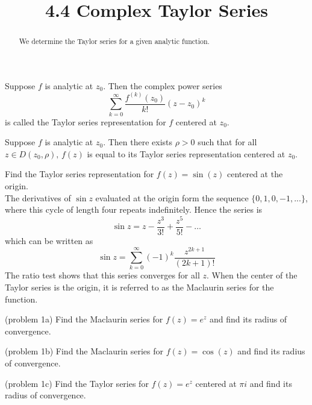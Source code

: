 \documentclass[handout]{ximera}
\title{4.4 Complex Taylor Series}
\begin{document}
\begin{abstract}
We determine the Taylor series for a given analytic function.
\end{abstract}

\maketitle


\begin{definition} 
Suppose $f$ is analytic at $z_0$. Then the complex power series
\[
\sum_{k=0}^\infty \frac{f^{(k)}(z_0)}{k!}(z-z_0)^k
\]
is called the Taylor series representation for $f$ centered at $z_0$.
\end{definition}

\begin{theorem}
Suppose $f$ is analytic at $z_0$. Then there exists $\rho >0$ such that for all $z \in D(z_0, \rho), \,f(z)$ is equal to its Taylor series representation centered at $z_0$.
\end{theorem}

\begin{example}[example 1]
Find the Taylor series representation for $f(z) = \sin(z)$ centered at the origin.\\
The derivatives of $\sin z$ evaluated at the origin form the sequence $\{0, 1, 0, -1,...\}$,
where this cycle of length four repeats indefinitely.
Hence the series is 
\[
\sin z = z - \frac{z^3}{3!} + \frac{z^5}{5!} - \dots
\]
which can be written as
\[
\sin z = \sum_{k=0}^\infty (-1)^k \frac{z^{2k+1}}{(2k+1)!}
\]
The ratio test shows that this series converges for all $z$.
When the center of the Taylor series is the origin, it is referred to as the Maclaurin series for the function.
\end{example}

\begin{problem}(problem 1a)
Find the Maclaurin series for $f(z) = e^z$ and find its radius of convergence.
\end{problem}

\begin{problem}(problem 1b)
Find the Maclaurin series for $f(z) = \cos(z)$ and find its radius of convergence.
\end{problem}

\begin{problem}(problem 1c)
Find the Taylor series for $f(z) = e^z$ centered at $\pi i$ and find its radius of convergence.
\end{problem}
\end{document}
